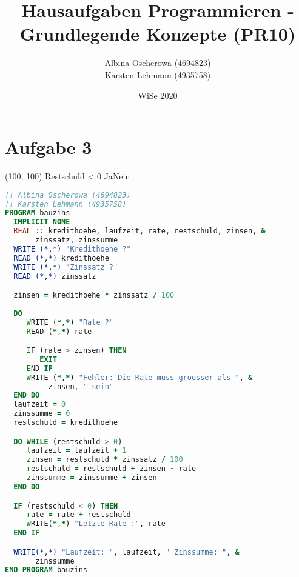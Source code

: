 \documentclass{article}
\author{
  Albina Oscherowa (4694823) \\
  Karsten Lehmann (4935758)
}
\date{WiSe 2020}
\title{Hausaufgaben Programmieren - Grundlegende Konzepte (PR10)}
\begin{document}
\maketitle

\newpage

\section*{Aufgabe 3}

\begin{struktogramm}(100, 100)
  \untilend
  \whileend
   {Restschuld < 0} {Ja}{Nein}
    \change
  \ifend
\end{struktogramm}

\newpage
\begin{lstlisting}[language=Fortran, showstringspaces=false]
!! Albina Oscherowa (4694823)
!! Karsten Lehmann (4935758)
PROGRAM bauzins
  IMPLICIT NONE
  REAL :: kredithoehe, laufzeit, rate, restschuld, zinsen, &
       zinssatz, zinssumme
  WRITE (*,*) "Kredithoehe ?"
  READ (*,*) kredithoehe
  WRITE (*,*) "Zinssatz ?"
  READ (*,*) zinssatz

  zinsen = kredithoehe * zinssatz / 100
  
  DO
     WRITE (*,*) "Rate ?"
     READ (*,*) rate

     IF (rate > zinsen) THEN
        EXIT
     END IF
     WRITE (*,*) "Fehler: Die Rate muss groesser als ", &
          zinsen, " sein"
  END DO
  laufzeit = 0
  zinssumme = 0
  restschuld = kredithoehe

  DO WHILE (restschuld > 0)
     laufzeit = laufzeit + 1
     zinsen = restschuld * zinssatz / 100
     restschuld = restschuld + zinsen - rate
     zinssumme = zinssumme + zinsen
  END DO

  IF (restschuld < 0) THEN
     rate = rate + restschuld
     WRITE(*,*) "Letzte Rate :", rate
  END IF

  WRITE(*,*) "Laufzeit: ", laufzeit, " Zinssumme: ", &
       zinssumme
END PROGRAM bauzins
\end{lstlisting}
\end{document}

